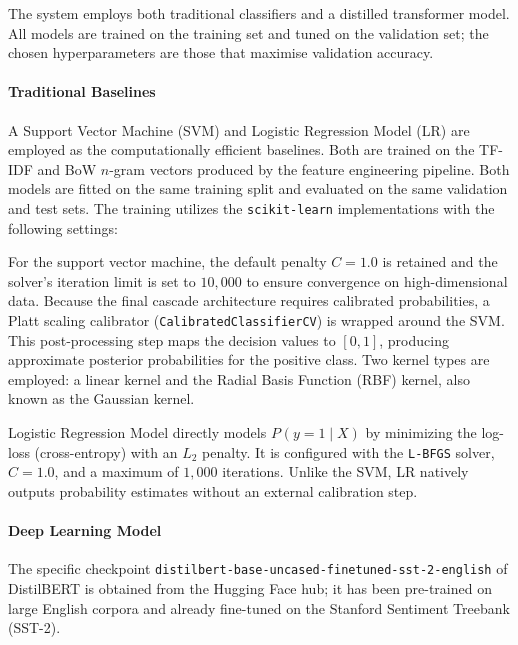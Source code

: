 \documentclass[a4paper,fleqn]{cas-dc}
\newcommand{\logreg}{LR}
\newcommand{\code}[1]{\texttt{#1}}
\newcommand{\inputtext}{X}
\newcommand{\predVal}{y}
\newcommand{\probLarge}[2]{P_{#1}(\predVal=1 \mid #2)}
\begin{document}
The system employs both traditional classifiers and a distilled transformer model. All models are trained on the training set and tuned on the validation set; the chosen hyperparameters are those that maximise validation accuracy.

\paragraph{Traditional Baselines} \label{sec:trad_models}

A Support Vector Machine (SVM)  and Logistic Regression Model (\logreg) are employed as the computationally efficient baselines. Both are trained on the TF-IDF and BoW $n$-gram vectors produced by the feature engineering pipeline. Both models are fitted on the same training split and evaluated on the same validation and test sets. The training utilizes the \code{scikit-learn} implementations with the following settings:

For the support vector machine, %
the default penalty $C=1.0$ is retained  and the solver’s iteration limit is set to $10{,}000$ to ensure convergence on high-dimensional data. Because the final cascade architecture requires calibrated probabilities, a Platt scaling calibrator (\texttt{CalibratedClassifierCV}) is wrapped around the SVM. This post‑processing step maps the decision values to $[0,1]$, producing approximate posterior probabilities for the positive class. Two kernel types are employed: a linear kernel and the Radial Basis Function (RBF) kernel, also known as the Gaussian kernel.

Logistic Regression Model directly models $\probLarge{}{\inputtext}$ by minimizing the log-loss (cross-entropy) with an $L_2$ penalty. It is configured with the \code{L-BFGS} solver, $C=1.0$, and a maximum of $1{,}000$ iterations. Unlike the SVM, \logreg{} natively outputs probability estimates without an external calibration step.

\paragraph{Deep Learning Model} \label{sec:distilbert_model}

The specific checkpoint \code{dis\-til\-bert-\-base-\-un\-ca\-sed-\-fi\-ne\-tu\-ned-sst-2-english} of DistilBERT is obtained from the Hugging Face hub; it has been pre-trained on large English corpora and already fine-tuned on the Stanford Sentiment Treebank (SST-2).
\end{document}
